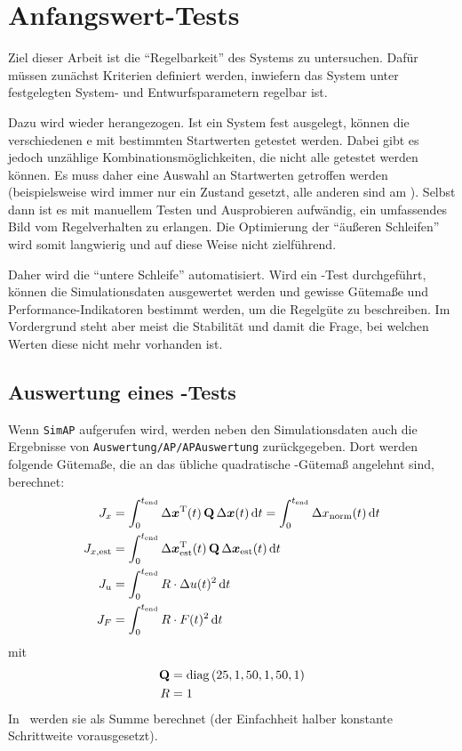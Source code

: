 \section{Anfangswert-Tests}\label{sec:x0test}

Ziel dieser Arbeit ist die "`Regelbarkeit"' des Systems zu untersuchen.
Dafür müssen zunächst Kriterien definiert werden, inwiefern das System unter festgelegten System- und Entwurfsparametern regelbar ist.

Dazu wird wieder  herangezogen.
Ist ein System fest ausgelegt, können die verschiedenen \ap e mit bestimmten Startwerten getestet werden.
Dabei gibt es jedoch unzählige Kombinationsmöglichkeiten, die nicht alle getestet werden können.
Es muss daher eine Auswahl an Startwerten getroffen werden (beispielsweise wird immer nur ein Zustand gesetzt, alle anderen sind am \ap).
Selbst dann ist es mit manuellem Testen und Ausprobieren aufwändig, ein umfassendes Bild vom Regelverhalten zu erlangen.
Die Optimierung der "`äußeren Schleifen"' wird somit langwierig und auf diese Weise nicht zielführend.

Daher wird die "`untere Schleife"' automatisiert.
Wird ein \ap-Test durchgeführt, können die Simulationsdaten ausgewertet werden und gewisse Gütemaße und Performance-Indikatoren bestimmt werden, um die Regelgüte zu beschreiben.
Im Vordergrund steht aber meist die Stabilität und damit die Frage, bei welchen Werten diese nicht mehr vorhanden ist.


\subsection{Auswertung eines \ap-Tests}

Wenn \texttt{SimAP} aufgerufen wird, werden neben den Simulationsdaten auch die Ergebnisse von \texttt{Auswertung/AP/APAuswertung} zurückgegeben.
Dort werden \ua folgende Gütemaße, die an das übliche quadratische \ricc-Gütemaß angelehnt sind, berechnet:
\begin{subequations} \begin{align} 
	J_x &= \int_{0}^{t_{\mathrm{end}}} \Delta \boldsymbol{x}^{\mathrm{T}}(t) \, {\boldsymbol{\mathrm{Q}}} \, \Delta \boldsymbol{x}(t)  \, \mathrm{d} t = \int_{0}^{t_{\mathrm{end}}} \Delta x_{\mathrm{norm}}(t)  \, \mathrm{d} t  \\
	J_{x,\mathrm{est}} &= \int_{0}^{t_{\mathrm{end}}} \Delta \boldsymbol{x}_{\mathrm{est}}^{\mathrm{T}}(t)  \,{\boldsymbol{\mathrm{Q}}}  \,\Delta \boldsymbol{x}_{\mathrm{est}}(t)  \, \mathrm{d} t  \\
	J_u &= \int_{0}^{t_{\mathrm{end}}}  R \cdot \Delta u(t)^2 \, \mathrm{d} t	\\
	J_F &= \int_{0}^{t_{\mathrm{end}}}  R \cdot F(t)^2 \, \mathrm{d} t
\end{align} \end{subequations}
mit
\begin{align*}
	{\ensuremath{\boldsymbol{\mathrm{Q}}}} &= \mathrm{diag}\left(25, 1, 50, 1, 50, 1 \right) \\
	R &= 1 
\end{align*}
In \ml\ werden sie als Summe berechnet (der Einfachheit halber konstante Schrittweite vorausgesetzt).

